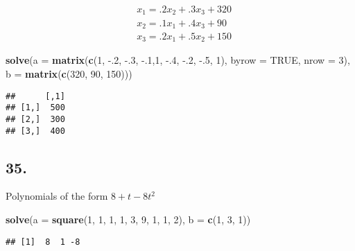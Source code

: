 \documentclass[]{article}
\newenvironment{Shaded}{\begin{snugshade}}{\end{snugshade}}
\newcommand{\DataTypeTok}[1]{\textcolor[rgb]{0.13,0.29,0.53}{#1}}
\newcommand{\DecValTok}[1]{\textcolor[rgb]{0.00,0.00,0.81}{#1}}
\newcommand{\FloatTok}[1]{\textcolor[rgb]{0.00,0.00,0.81}{#1}}
\newcommand{\KeywordTok}[1]{\textcolor[rgb]{0.13,0.29,0.53}{\textbf{#1}}}
\newcommand{\NormalTok}[1]{#1}
\newcommand{\OtherTok}[1]{\textcolor[rgb]{0.56,0.35,0.01}{#1}}
\begin{document}
\[\begin{align}
&x_1=.2x_2+.3x_3+320\\
&x_2=.1x_1+.4x_3+90\\
&x_3=.2x_1+.5x_2+150
\end{align}\]

\begin{Shaded}
\begin{Highlighting}[]
\KeywordTok{solve}\NormalTok{(}\DataTypeTok{a =} \KeywordTok{matrix}\NormalTok{(}\KeywordTok{c}\NormalTok{(}\DecValTok{1}\NormalTok{, }\FloatTok{-.2}\NormalTok{, }\FloatTok{-.3}\NormalTok{, }
                   \FloatTok{-.1}\NormalTok{,}\DecValTok{1}\NormalTok{, }\FloatTok{-.4}\NormalTok{,}
                   \FloatTok{-.2}\NormalTok{, }\FloatTok{-.5}\NormalTok{, }\DecValTok{1}\NormalTok{), }\DataTypeTok{byrow =} \OtherTok{TRUE}\NormalTok{, }\DataTypeTok{nrow =} \DecValTok{3}\NormalTok{),}
      \DataTypeTok{b =} \KeywordTok{matrix}\NormalTok{(}\KeywordTok{c}\NormalTok{(}\DecValTok{320}\NormalTok{, }\DecValTok{90}\NormalTok{, }\DecValTok{150}\NormalTok{)))}
\end{Highlighting}
\end{Shaded}

\begin{verbatim}
##      [,1]
## [1,]  500
## [2,]  300
## [3,]  400
\end{verbatim}

\hypertarget{section-4}{%
\subsection{35.}\label{section-4}}

Polynomials of the form \(8 + t -8t^2\)

\begin{Shaded}
\begin{Highlighting}[]
\KeywordTok{solve}\NormalTok{(}\DataTypeTok{a =} \KeywordTok{square}\NormalTok{(}\DecValTok{1}\NormalTok{, }\DecValTok{1}\NormalTok{, }\DecValTok{1}\NormalTok{, }\DecValTok{1}\NormalTok{, }\DecValTok{3}\NormalTok{, }\DecValTok{9}\NormalTok{, }\DecValTok{1}\NormalTok{, }\DecValTok{1}\NormalTok{, }\DecValTok{2}\NormalTok{),}
      \DataTypeTok{b =} \KeywordTok{c}\NormalTok{(}\DecValTok{1}\NormalTok{, }\DecValTok{3}\NormalTok{, }\DecValTok{1}\NormalTok{))}
\end{Highlighting}
\end{Shaded}

\begin{verbatim}
## [1]  8  1 -8
\end{verbatim}
\end{document}
